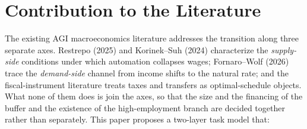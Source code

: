 \documentclass[review,12pt]{elsarticle}
\theoremstyle{plain}
\theoremstyle{definition}
\theoremstyle{remark}
\begin{document}
\section{Contribution to the Literature}
\label{sec:literature}
The existing AGI macroeconomics literature addresses the transition along three separate axes. Restrepo (2025) and Korinek--Suh (2024) characterize the \emph{supply-side} conditions under which automation collapses wages; Fornaro--Wolf (2026) trace the \emph{demand-side} channel from income shifts to the natural rate; and the fiscal-instrument literature treats taxes and transfers as optimal-schedule objects. What none of them does is join the axes, so that the size and the financing of the buffer and the existence of the high-employment branch are decided together rather than separately. This paper proposes a two-layer task model that:
\end{document}
